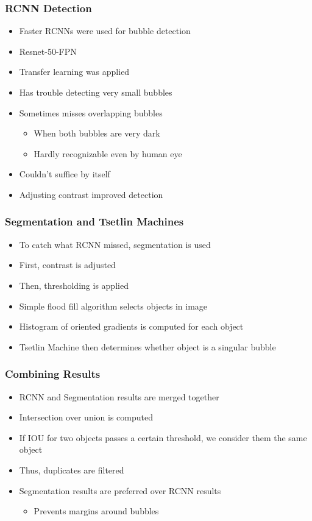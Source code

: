 \documentclass{beamer}
\begin{document}
\begin{frame}
    \frametitle{RCNN Detection}

    \begin{itemize}
        \item Faster RCNNs were used for bubble detection
        \item Resnet-50-FPN
        \item Transfer learning was applied
        \item Has trouble detecting very small bubbles
        \item Sometimes misses overlapping bubbles
        \begin{itemize}
            \item When both bubbles are very dark
            \item Hardly recognizable even by human eye
        \end{itemize}
        \item Couldn't suffice by itself
        \item Adjusting contrast improved detection
    \end{itemize}

\end{frame}

\begin{frame}
    \frametitle{Segmentation and Tsetlin Machines}

    \begin{itemize}
        \item To catch what RCNN missed, segmentation is used
        \item First, contrast is adjusted
        \item Then, thresholding is applied
        \item Simple flood fill algorithm selects objects in image
        \item Histogram of oriented gradients is computed for each object
        \item Tsetlin Machine then determines whether object is a singular bubble
    \end{itemize}

\end{frame}

\begin{frame}
    \frametitle{Combining Results}

    \begin{itemize}
        \item RCNN and Segmentation results are merged together
        \item Intersection over union is computed
        \item If IOU for two objects passes a certain threshold, we consider them the same object
        \item Thus, duplicates are filtered
        \item Segmentation results are preferred over RCNN results
        \begin{itemize}
            \item Prevents margins around bubbles
        \end{itemize}
    \end{itemize}

\end{frame}
\end{document}
